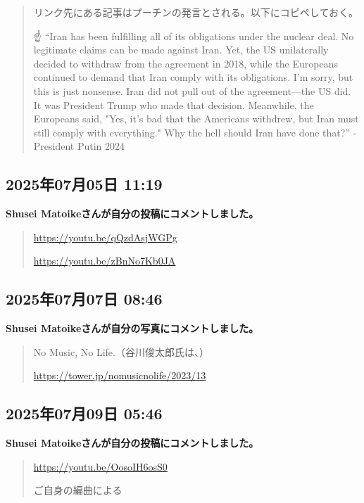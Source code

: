 \begin{quote}
リンク先にある記事はプーチンの発言とされる。以下にコピペしておく。

☝ “Iran has been fulfilling all of its obligations under the nuclear deal. No legitimate claims can be made against Iran. Yet, the US unilaterally decided to withdraw from the agreement in 2018, while the Europeans continued to demand that Iran comply with its obligations. I’m sorry, but this is just nonsense. Iran did not pull out of the agreement—the US did. It was President Trump who made that decision. Meanwhile, the Europeans said, "Yes, it’s bad that the Americans withdrew, but Iran must still comply with everything." Why the hell should Iran have done that?” - President Putin 2024
\end{quote}

\subsection*{2025年07月05日 11:19}

\textbf{Shusei Matoikeさんが自分の投稿にコメントしました。}

\begin{quote}
\url{https://youtu.be/qQzdAsjWGPg}

\url{https://youtu.be/zBnNo7Kb0JA}
\end{quote}

\subsection*{2025年07月07日 08:46}

\textbf{Shusei Matoikeさんが自分の写真にコメントしました。}

\begin{quote}
No Music, No Life.（谷川俊太郎氏は、）

\url{https://tower.jp/nomusicnolife/2023/13}
\end{quote}

\subsection*{2025年07月09日 05:46}

\textbf{Shusei Matoikeさんが自分の投稿にコメントしました。}

\begin{quote}
\url{https://youtu.be/OosoIH6osS0}

ご自身の編曲による
\end{quote}

